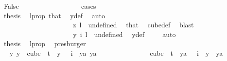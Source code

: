 \begin{isabellebody}
\ False\isanewline
\ \ \ \ \ \ \ \ \ \ \ \ \ \ \ \ \isamarkupfalse%
\ cases\isanewline
\ \ \ \ \ \ \ \ \ \ \ \ \ \ \ \ \ \ \isamarkupfalse%
\ {}\isanewline
\ \ \ \ \ \ \ \ \ \ \ \ \ \ \ \ \ \ \isamarkupfalse%
\ \isamarkupfalse%
\ {\isacharquery}{\kern0pt}thesis\ \isamarkupfalse%
\ l{\isacharunderscore}{\kern0pt}prop\ that{\isacharparenleft}{\kern0pt}{}{\isacharparenright}{\kern0pt}\ \isamarkupfalse%
\ y{\isacharunderscore}{\kern0pt}def\ \isamarkupfalse%
\ auto\isanewline
\ \ \ \ \ \ \ \ \ \ \ \ \ \ \ \ \isamarkupfalse%
\isanewline
\ \ \ \ \ \ \ \ \ \ \ \ \ \ \ \ \ \ \isamarkupfalse%
\ {}\isanewline
\ \ \ \ \ \ \ \ \ \ \ \ \ \ \ \ \ \ \isamarkupfalse%
\ \isamarkupfalse%
\ {\isachardoublequoteopen}z\ l\ {\isacharequal}{\kern0pt}\ undefined{\isachardoublequoteclose}\ \isamarkupfalse%
\ that\ \isamarkupfalse%
\ cube{\isacharunderscore}{\kern0pt}def\ \isamarkupfalse%
\ blast\isanewline
\ \ \ \ \ \ \ \ \ \ \ \ \ \ \ \ \ \ \isamarkupfalse%
\ \isamarkupfalse%
\ {\isachardoublequoteopen}y\ i\ l\ {\isacharequal}{\kern0pt}\ undefined{\isachardoublequoteclose}\ \isamarkupfalse%
\ y{\isacharunderscore}{\kern0pt}def\ \isamarkupfalse%
\ {}\ \isamarkupfalse%
\ auto\isanewline
\ \ \ \ \ \ \ \ \ \ \ \ \ \ \ \ \ \ \isamarkupfalse%
\ \isamarkupfalse%
\ {\isacharquery}{\kern0pt}thesis\ \isamarkupfalse%
\ l{\isacharunderscore}{\kern0pt}prop\ \isamarkupfalse%
\ presburger\isanewline
\ \ \ \ \ \ \ \ \ \ \ \ \ \ \ \ \isamarkupfalse%
\isanewline
\ \ \ \ \ \ \ \ \ \ \ \ \ \ \isamarkupfalse%
\isanewline
\ \ \ \ \ \ \ \ \ \ \ \ \ \ \isamarkupfalse%
\ \isamarkupfalse%
\ {\isachardoublequoteopen}{\isasymexists}y{\isachardot}{\kern0pt}\ {\isacharparenleft}{\kern0pt}y\ {\isasymin}\ cube\ {}\ t\ {\isasymand}\ y\ {}\ {\isacharequal}{\kern0pt}\ i{\isacharparenright}{\kern0pt}\ {\isasymand}\ {\isacharparenleft}{\kern0pt}{\isasymforall}ya{\isachardot}{\kern0pt}\ ya\isanewline
\ \ \ \ \ \ \ \ \ \ \ \ \ \ {\isasymin}\ cube\ {}\ t\ {\isasymand}\ ya\ {}\ {\isacharequal}{\kern0pt}\ i\ {\isasymlongrightarrow}\ y\ {\isacharequal}{\kern0pt}\ ya{\isacharparenright}{\kern0pt}{\isachardoublequoteclose}\ \isamarkupfalse%

\end{isabellebody}
